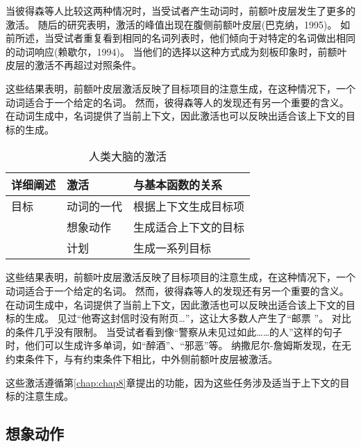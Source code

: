 当彼得森等人比较这两种情况时，当受试者产生动词时，前额叶皮层发生了更多的激活。
随后的研究表明，激活的峰值出现在腹侧前额叶皮层(巴克纳，1995)。
如前所述，当受试者重复看到相同的名词列表时，他们倾向于对特定的名词做出相同的动词响应(赖歇尔，1994)。
当他们的选择以这种方式成为刻板印象时，前额叶皮层的激活不再超过对照条件。
\par


这些结果表明，前额叶皮层激活反映了目标项目的注意生成，在这种情况下，一个动词适合于一个给定的名词。
然而，彼得森等人的发现还有另一个重要的含义。
在动词生成中，名词提供了当前上下文，因此激活也可以反映出适合该上下文的目标的生成。
\par


\begin{table}[htbp] 
	\newcommand{\tabincell}[2]{\begin{tabular}{@{}#1@{}}#2\end{tabular}} %
	\centering
	\caption{人类大脑的激活\label{tab:9_2}}
	\renewcommand\arraystretch{1.5}	%
	\begin{tabular}{lll}
		\toprule
		详细阐述 & 激活 & 与基本函数的关系\\
		\midrule
		目标 & 动词的一代 & 根据上下文生成目标项  \\
		& 想象动作 & 生成适合上下文的目标 \\
		&  计划 & 生成一系列目标 \\
		\bottomrule
		
	\end{tabular}%
\end{table}%


这些结果表明，前额叶皮层激活反映了目标项目的注意生成，在这种情况下，一个动词适合于一个给定的名词。
然而，彼得森等人的发现还有另一个重要的含义。
在动词生成中，名词提供了当前上下文，因此激活也可以反映出适合该上下文的目标的生成。
见过“他寄这封信时没有附页…”，这让大多数人产生了“邮票 ”。
对比的条件几乎没有限制。
当受试者看到像“警察从未见过如此……的人”这样的句子时，他们可以生成许多单词，如“醉酒”、“邪恶”等。
纳撒尼尔-詹姆斯发现，在无约束条件下，与有约束条件下相比，中外侧前额叶皮层被激活。
\par


这些激活遵循第\ref{chap:chap8}章提出的功能，因为这些任务涉及适当于上下文的目标的注意生成。



\subsection{想象动作}

